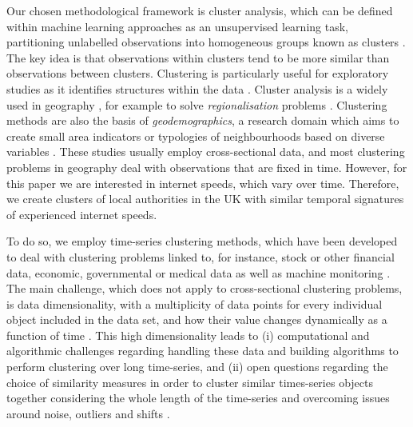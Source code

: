 \documentclass[]{interact}
\theoremstyle{plain}%
\theoremstyle{definition}
\theoremstyle{remark}
\begin{document}
Our chosen methodological framework is cluster analysis, which can be
defined within machine learning approaches as an unsupervised learning
task, partitioning unlabelled observations into homogeneous groups known
as clusters \citep{montero2014tsclust}. The key idea is that
observations within clusters tend to be more similar than observations
between clusters. Clustering is particularly useful for exploratory
studies as it identifies structures within the data
\citep{aghabozorgi2015time}. Cluster analysis is a widely used in
geography \citep{gordon1977classification, everitt1974cluster}, for
example to solve \emph{regionalisation} problems
\citep{niesterowicz2016}. Clustering methods are also the basis of
\emph{geodemographics}, a research domain which aims to create small
area indicators or typologies of neighbourhoods based on diverse
variables \citep{SINGLETON2009289, harris2005geodemographics}. These
studies usually employ cross-sectional data, and most clustering
problems in geography deal with observations that are fixed in time.
However, for this paper we are interested in internet speeds, which vary
over time. Therefore, we create clusters of local authorities in the UK
with similar temporal signatures of experienced internet speeds.

To do so, we employ time-series clustering methods, which have been
developed to deal with clustering problems linked to, for instance,
stock or other financial data, economic, governmental or medical data as
well as machine monitoring
\citep{aggarwal2013time, aggarwal2001surprising, hyndman2015large, WARRENLIAO20051857}.
The main challenge, which does not apply to cross-sectional clustering
problems, is data dimensionality, with a multiplicity of data points for
every individual object included in the data set, and how their value
changes dynamically as a function of time \citep{aghabozorgi2015time}.
This high dimensionality leads to (i) computational and algorithmic
challenges regarding handling these data and building algorithms to
perform clustering over long time-series, and (ii) open questions
regarding the choice of similarity measures in order to cluster similar
times-series objects together considering the whole length of the
time-series and overcoming issues around noise, outliers and shifts
\citep{lin2004iterative, aghabozorgi2015time}.
\end{document}

